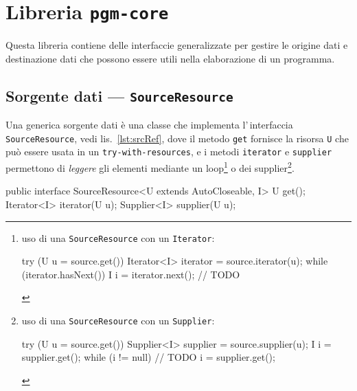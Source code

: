 \chapter{Libreria \texttt{pgm-core}}
Questa libreria contiene delle interfaccie generalizzate per gestire le origine
dati e destinazione dati che possono essere utili nella elaborazione di un
programma.

\VerbatimFootnotes
\section{Sorgente dati --- \texttt{SourceResource}} \label{sec:srcRes}
Una generica sorgente dati è una classe che implementa l'\,interfaccia
\texttt{SourceResource}, vedi lis.~\ref{lst:srcRef}, dove il metodo \texttt{get}
fornisce la risorsa \texttt{U} che può essere usata in un
\texttt{try-with-resources}, e i metodi \texttt{iterator} e \texttt{supplier}
permettono di \textsl{leggere} gli elementi mediante un loop\footnote{%
    uso di una \texttt{SourceResource} con un \texttt{Iterator}:
    \begin{javacode}
        try (U u = source.get()) {
        Iterator<I> iterator = source.iterator(u);
        while (iterator.hasNext()) {
            I i = iterator.next();
            // TODO
        }
    }
    \end{javacode}
} o dei supplier\footnote{%
    uso di una \texttt{SourceResource} con un \texttt{Supplier}:
    \begin{javacode}
        try (U u = source.get()) {
        Supplier<I> supplier = source.supplier(u);
        I i = supplier.get();
        while (i != null) {
            // TODO
            i = supplier.get();
        }
    }
    \end{javacode}
}.

\begin{elisting}[!htb]
\begin{javacode}
public interface SourceResource<U extends AutoCloseable, I> {
    U get();
    Iterator<I> iterator(U u);
    Supplier<I> supplier(U u);
}
\end{javacode}
\caption{Metodi per aprire la risorsa e leggere i dati}
\label{lst:srcRef}
\end{elisting}

